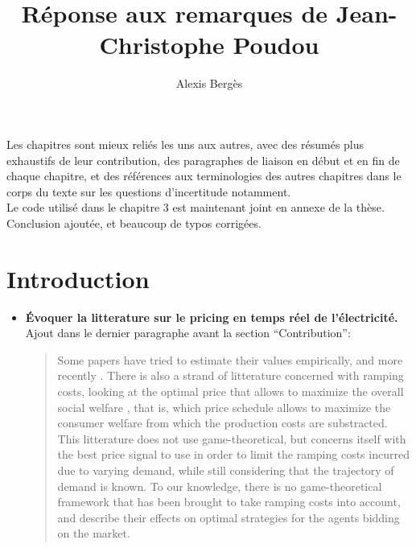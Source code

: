 \documentclass{article}
\begin{document}
\title{Réponse aux remarques de Jean-Christophe Poudou}
\author{Alexis Bergès}

\maketitle

Les chapitres sont mieux reliés les uns aux autres, avec des résumés plus exhaustifs de leur contribution, des paragraphes de liaison en début et en fin de chaque chapitre, et des références aux terminologies des autres chapitres dans le corps du texte sur les questions d'incertitude notamment.\\

Le code utilisé dans le chapitre 3 est maintenant joint en annexe de la thèse.\\

Conclusion ajoutée, et beaucoup de typos corrigées.\\

\section{Introduction}
\begin{itemize}
\item \textbf{Évoquer la litterature sur le pricing en temps réel de l'électricité.}\\

Ajout dans le dernier paragraphe avant la section ``Contribution'':

\begin{quote}
Some papers have tried to estimate their values empirically, \cite{wolak2007quantifying} and more recently \cite{reguant2011welfare}. There is also a strand of litterature concerned with ramping costs, looking at the optimal price that allows to maximize the overall social welfare \cite{tanaka2006real}, that is, which price schedule allows to maximize the consumer welfare from which the production costs are substracted. This litterature does not use game-theoretical, but concerns itself with the best price signal to use in order to limit the ramping costs incurred due to varying demand, while still considering that the trajectory of demand is known. To our knowledge, there is no game-theoretical framework that has been brought to take ramping costs into account, and describe their effects on optimal strategies for the agents bidding on the market. 
\end{quote}

\end{itemize}
\end{document}
